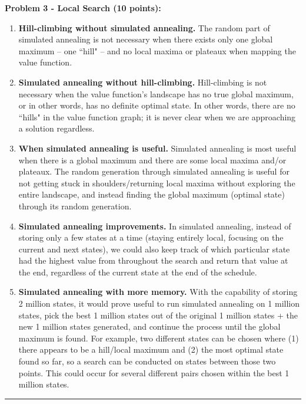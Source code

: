 \documentclass[12pt]{article}
\begin{document}
\textbf{Problem 3 - Local Search (10 points):}
\begin{enumerate}[label=(\alph*)]
    \item \textbf{Hill-climbing without simulated annealing.} The random part of simulated annealing is not necessary when there exists only one global maximum -- one ``hill" -- and no local maxima or plateaux when mapping the value function.
    \item \textbf{Simulated annealing without hill-climbing.} Hill-climbing is not necessary when the value function's landscape has no true global maximum, or in other words, has no definite optimal state. In other words, there are no ``hills" in the value function graph; it is never clear when we are approaching a solution regardless.
    \item \textbf{When simulated annealing is useful.} Simulated annealing is most useful when there is a global maximum and there are some local maxima and/or plateaux. The random generation through simulated annealing is useful for not getting stuck in shoulders/returning local maxima without exploring the entire landscape, and instead finding the global maximum (optimal state) through its random generation. 
    \item \textbf{Simulated annealing improvements.} In simulated annealing, instead of storing only a few states at a time (staying entirely local, focusing on the current and next states), we could also keep track of which particular state had the highest value from throughout the search and return that value at the end, regardless of the current state at the end of the schedule.
    \item \textbf{Simulated annealing with more memory.} With the capability of storing 2 million states, it would prove useful to run simulated annealing on 1 million states, pick the best 1 million states out of the original 1 million states + the new 1 million states generated, and continue the process until the global maximum is found. For example, two different states can be chosen where (1) there appears to be a hill/local maximum and (2) the most optimal state found so far, so a search can be conducted on states between those two points. This could occur for several different pairs chosen within the best 1 million states.
\end{enumerate}


\rule{\linewidth}{0.4pt}
\vspace{.2cm}
\end{document}
